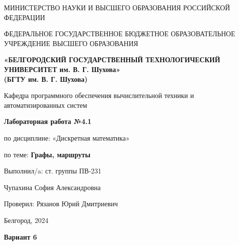 \documentclass[12pt]{article}
\begin{document}
	\begin{center}
		{\parskip=1cm
			МИНИСТЕРСТВО НАУКИ И ВЫСШЕГО ОБРАЗОВАНИЯ РОССИЙСКОЙ ФЕДЕРАЦИИ
			
			ФЕДЕРАЛЬНОЕ ГОСУДАРСТВЕННОЕ БЮДЖЕТНОЕ ОБРАЗОВАТЕЛЬНОЕ УЧРЕЖДЕНИЕ ВЫСШЕГО ОБРАЗОВАНИЯ
			
			{\bf«БЕЛГОРОДСКИЙ ГОСУДАРСТВЕННЫЙ ТЕХНОЛОГИЧЕСКИЙ УНИВЕРСИТЕТ им. В. Г. Шухова»\\(БГТУ им. В. Г. Шухова)}
			
			\begin{figure}[bh]
				\noindent{}
			\end{figure}
			Кафедра программного обеспечения вычислительной техники и автоматизированных систем
		}
		
		{\Large 
			\vspace{1cm}
			{\parskip=0.25cm 
				{\bf Лабораторная работа №4.1}
				
				по дисциплине: «Дискретная математика»
				
				по теме: {\bf Графы, маршруты}
			}
		}
	\end{center}	
	\begin{flushleft}
		{\leftskip=10cm
			{\vspace{3cm} Выполнил/a: ст. группы ПВ-231}
			
			Чупахина София Александровна
			
			Проверил: Рязанов Юрий Дмитриевич
			
		}
	\end{flushleft}
	\begin{center}
		{\parskip=3cm Белгород, 2024}
	\end{center}
	\newpage

	\tableofcontents
	
	\vspace{1cm}
	
	{\Large \bf Вариант 6}
	 
\end{document}
